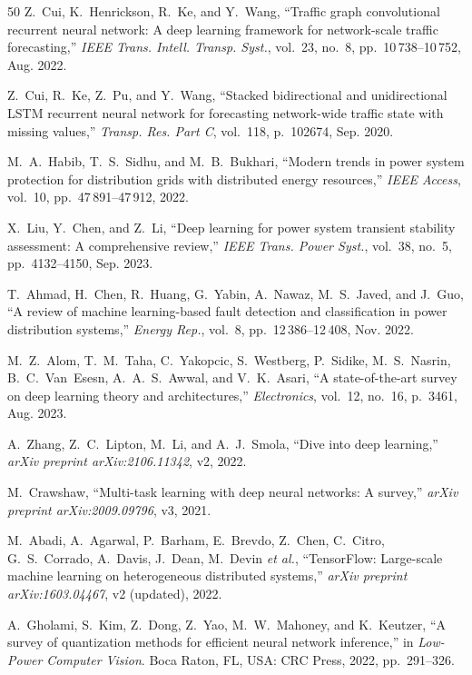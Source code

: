 \documentclass[journal]{IEEEtran}
\begin{document}
\begin{thebibliography}{50}
Z.~Cui, K.~Henrickson, R.~Ke, and Y.~Wang, ``Traffic graph convolutional recurrent neural network: A deep learning framework for network-scale traffic forecasting,'' \textit{IEEE Trans. Intell. Transp. Syst.}, vol.~23, no.~8, pp.~10\,738--10\,752, Aug. 2022.

Z.~Cui, R.~Ke, Z.~Pu, and Y.~Wang, ``Stacked bidirectional and unidirectional LSTM recurrent neural network for forecasting network-wide traffic state with missing values,'' \textit{Transp. Res. Part C}, vol.~118, p.~102674, Sep. 2020.

M.~A.~Habib, T.~S.~Sidhu, and M.~B.~Bukhari, ``Modern trends in power system protection for distribution grids with distributed energy resources,'' \textit{IEEE Access}, vol.~10, pp.~47\,891--47\,912, 2022.

X.~Liu, Y.~Chen, and Z.~Li, ``Deep learning for power system transient stability assessment: A comprehensive review,'' \textit{IEEE Trans. Power Syst.}, vol.~38, no.~5, pp.~4132--4150, Sep. 2023.

T.~Ahmad, H.~Chen, R.~Huang, G.~Yabin, A.~Nawaz, M.~S.~Javed, and J.~Guo, ``A review of machine learning-based fault detection and classification in power distribution systems,'' \textit{Energy Rep.}, vol.~8, pp.~12\,386--12\,408, Nov. 2022.

M.~Z.~Alom, T.~M.~Taha, C.~Yakopcic, S.~Westberg, P.~Sidike, M.~S.~Nasrin, B.~C.~Van~Esesn, A.~A.~S.~Awwal, and V.~K.~Asari, ``A state-of-the-art survey on deep learning theory and architectures,'' \textit{Electronics}, vol.~12, no.~16, p.~3461, Aug. 2023.

A.~Zhang, Z.~C.~Lipton, M.~Li, and A.~J.~Smola, ``Dive into deep learning,'' \textit{arXiv preprint arXiv:2106.11342}, v2, 2022.

M.~Crawshaw, ``Multi-task learning with deep neural networks: A survey,'' \textit{arXiv preprint arXiv:2009.09796}, v3, 2021.

M.~Abadi, A.~Agarwal, P.~Barham, E.~Brevdo, Z.~Chen, C.~Citro, G.~S.~Corrado, A.~Davis, J.~Dean, M.~Devin \emph{et al.}, ``TensorFlow: Large-scale machine learning on heterogeneous distributed systems,'' \textit{arXiv preprint arXiv:1603.04467}, v2 (updated), 2022.

A.~Gholami, S.~Kim, Z.~Dong, Z.~Yao, M.~W.~Mahoney, and K.~Keutzer, ``A survey of quantization methods for efficient neural network inference,'' in \textit{Low-Power Computer Vision}. Boca Raton, FL, USA: CRC Press, 2022, pp.~291--326.


\end{thebibliography}
\end{document}
